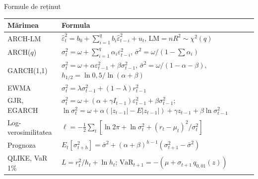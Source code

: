 \begin{frame}{Formule de reținut}
\itemsize{\small}
{\renewcommand{\arraystretch}{1.4}\begin{center}
\scriptsize
\begin{tabular}{ll}
\toprule
\textbf{Mărimea} & \textbf{Formula} \\
\midrule
ARCH-LM & $\hat\varepsilon_t^2 = b_0 + \sum_{i=1}^{q}b_i\hat\varepsilon_{t-i}^2 + u_t$, \quad $\mathrm{LM} = nR^2 \sim \chi^2(q)$ \\
ARCH($q$) & $\sigma_t^2 = \omega + \sum_{i=1}^{q}\alpha_i\varepsilon_{t-i}^2$, \quad $\bar\sigma^2 = \omega/(1 - \sum\alpha_i)$ \\
GARCH(1,1) & $\sigma_t^2 = \omega + \alpha\varepsilon_{t-1}^2 + \beta\sigma_{t-1}^2$, \quad $\bar\sigma^2 = \omega/(1 - \alpha - \beta)$, \quad $h_{1/2} = \ln 0{,}5/\ln(\alpha + \beta)$ \\
EWMA & $\sigma_t^2 = \lambda\sigma_{t-1}^2 + (1 - \lambda)r_{t-1}^2$ \\
GJR, EGARCH & $\sigma_t^2 = \omega + (\alpha + \gamma I_{t-1})\varepsilon_{t-1}^2 + \beta\sigma_{t-1}^2$; \quad $\ln\sigma_t^2 = \omega + \alpha(|z_{t-1}| - E|z_{t-1}|) + \gamma z_{t-1} + \beta\ln\sigma_{t-1}^2$ \\
Log-verosimilitatea & $\ell = -\frac12\sum_t[\ln 2\pi + \ln\sigma_t^2 + (r_t - \mu_t)^2/\sigma_t^2]$ \\
Prognoza & $E_t[\sigma_{t+h}^2] = \bar\sigma^2 + (\alpha + \beta)^{h-1}(\sigma_{t+1}^2 - \bar\sigma^2)$ \\
QLIKE, VaR 1\% & $L = r_t^2/h_t + \ln h_t$; \quad $\mathrm{VaR}_{t+1} = -(\mu + \sigma_{t+1}\,q_{0{,}01}(z))$ \\
\bottomrule
\end{tabular}
\end{center}
}
\end{frame}

